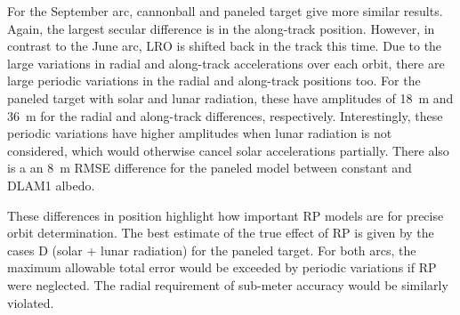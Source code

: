 For the September arc, cannonball and paneled target give more similar results. Again, the largest secular difference is in the along-track position. However, in contrast to the June arc, \gls{LRO} is shifted back in the track this time. Due to the large variations in radial and along-track accelerations over each orbit, there are large periodic variations in the radial and along-track positions too. For the paneled target with solar and lunar radiation, these have amplitudes of \qty{18}{\m} and \qty{36}{\m} for the radial and along-track differences, respectively. Interestingly, these periodic variations have higher amplitudes when lunar radiation is not considered, which would otherwise cancel solar accelerations partially. There also is a an \qty{8}{m} RMSE difference for the paneled model between constant and \gls{DLAM1} albedo.


These differences in position highlight how important \gls{RP} models are for precise orbit determination. The best estimate of the true effect of \gls{RP} is given by the cases D (solar + lunar radiation) for the paneled target. For both arcs, the maximum allowable total error would be exceeded by periodic variations if \gls{RP} were neglected. The radial requirement of sub-meter accuracy would be similarly violated.





    
%             
    
    
%             

